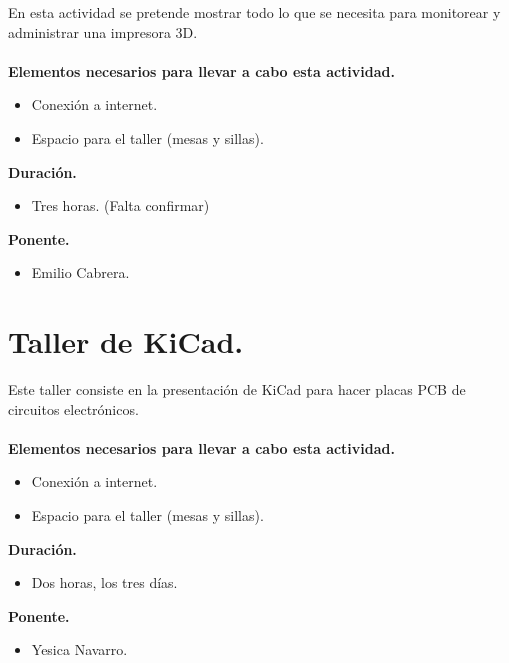 \documentclass[a4paper,11pt]{article}                 %
\begin{document}
   En esta actividad se pretende mostrar todo lo que se necesita para monitorear y administrar una impresora 3D.
      \paragraph{}
  \textbf{Elementos necesarios para llevar a cabo esta actividad.}
  \begin{itemize}
    \item Conexión a internet.
    \item Espacio para el taller (mesas y sillas).
  \end{itemize}
  
  \textbf{Duración.}
  \begin{itemize}
    \item Tres horas. (Falta confirmar)
  \end{itemize}
  
              \textbf{Ponente.}
  \begin{itemize}
    \item Emilio Cabrera.
  \end{itemize}
  
  
              \section{Taller de KiCad.}                                     %

   Este taller consiste en la presentación de KiCad para hacer placas PCB de circuitos electrónicos.
      \paragraph{}
  \textbf{Elementos necesarios para llevar a cabo esta actividad.}
  \begin{itemize}
    \item Conexión a internet.
    \item Espacio para el taller (mesas y sillas).
  \end{itemize}
  
  \textbf{Duración.}
  \begin{itemize}
    \item Dos horas, los tres días.
  \end{itemize}
  
              \textbf{Ponente.}
  \begin{itemize}
    \item Yesica Navarro.
  \end{itemize}
  
\end{document}
